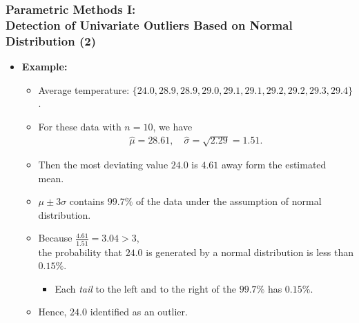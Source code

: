 \begin{frame}
	\frametitle{Parametric Methods I: \\ Detection of Univariate Outliers Based on Normal Distribution (2)}
	\begin{itemize}
		\item \textbf{Example:}
		      \begin{itemize}
			      \item Average temperature: $\{24.0, 28.9, 28.9, 29.0, 29.1, 29.1, 29.2, 29.2, 29.3, 29.4\}$.
			      \item For these data with $n = 10$, we have
			            \begin{align}
				            \widehat{\mu}=28.61, \quad \widehat{\sigma}=\sqrt{2.29}=1.51.
			            \end{align}
			      \item Then the most deviating value $24.0$ is $4.61$ away form the estimated mean.
			      \item $\mu \pm 3\sigma $ contains $99.7\%$ of the data under the assumption of normal distribution.
			      \item Because $\frac{4.61}{1.51}  =  3.04  >  3$, \\
			            the probability that $24.0$ is generated by a normal distribution is less than $0.15\%$.
			            \begin{itemize}
				            \item Each \emph{tail} to the left and to the right of the $99.7\%$ has $0.15\%$.
			            \end{itemize}
			      \item Hence, $24.0$ identified as an outlier.
		      \end{itemize}
	\end{itemize}
\end{frame}


